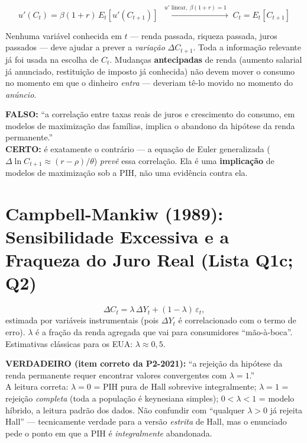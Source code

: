 \documentclass[12pt, a4paper]{article}
\begin{document}
\begin{formulabox}[title={A equação de Euler sob utilidade quadrática}]
\[
  u'(C_t) = \beta(1+r)\,E_t[u'(C_{t+1})] \;\xrightarrow{\;u'\text{ linear},\;\beta(1+r)=1\;}\;
  \boxed{C_t = E_t[C_{t+1}]}
\]
\end{formulabox}

\begin{fatorbox}[title={O conteúdo empírico (testável)}]
Nenhuma variável conhecida em $t$ --- renda passada, riqueza passada, juros
passados --- deve ajudar a prever a \emph{variação} $\Delta C_{t+1}$. Toda a
informação relevante já foi usada na escolha de $C_t$. Mudanças
\textbf{antecipadas} de renda (aumento salarial já anunciado, restituição de
imposto já conhecida) não devem mover o consumo no momento em que o dinheiro
\emph{entra} --- deveriam tê-lo movido no momento do \emph{anúncio}.
\end{fatorbox}

\begin{armbox}[title={Armadilha (P2-2021 Q1-iii)}]
\textbf{FALSO:} ``a correlação entre taxas reais de juros e crescimento do
consumo, em modelos de maximização das famílias, implica o abandono da
hipótese da renda permanente.'' \\
\textbf{CERTO:} é exatamente o contrário --- a equação de Euler generalizada
($\Delta\ln C_{t+1}\approx (r-\rho)/\theta$) \emph{prevê} essa correlação. Ela
é uma \textbf{implicação} de modelos de maximização sob a PIH, não uma
evidência contra ela.
\end{armbox}

\section{Campbell-Mankiw (1989): Sensibilidade Excessiva e a Fraqueza do Juro Real (Lista Q1c; Q2)}

\begin{formulabox}[title={A regressão de Campbell-Mankiw}]
\[
  \Delta C_t = \lambda\,\Delta Y_t + (1-\lambda)\,\varepsilon_t,
\]
estimada por variáveis instrumentais (pois $\Delta Y_t$ é correlacionado com
o termo de erro). $\lambda$ é a fração da renda agregada que vai para
consumidores ``mão-à-boca''. Estimativas clássicas para os EUA:
$\lambda\approx 0{,}5$.
\end{formulabox}

\begin{armbox}[title={Armadilha de interpretação (P2-2021 Q1-ii)}]
\textbf{VERDADEIRO (item correto da P2-2021):} ``a rejeição da hipótese da
renda permanente requer encontrar valores convergentes com $\lambda=1$.''\\
A leitura correta: $\lambda=0$ = PIH pura de Hall sobrevive integralmente;
$\lambda=1$ = rejeição \emph{completa} (toda a população é keynesiana
simples); $0<\lambda<1$ = modelo híbrido, a leitura padrão dos dados. Não
confundir com ``qualquer $\lambda>0$ já rejeita Hall'' --- tecnicamente
verdade para a versão \emph{estrita} de Hall, mas o enunciado pede o ponto em
que a PIH é \emph{integralmente} abandonada.
\end{armbox}
\end{document}
